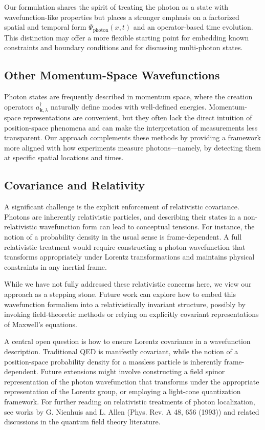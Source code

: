 \documentclass[aps,prl,twocolumn,showpacs,showkeys,superscriptaddress,amsmath,amssymb]{revtex4-2}
\begin{document}
Our formulation shares the spirit of treating the photon as a state with wavefunction-like properties but places a stronger emphasis on a factorized spatial and temporal form $\Psi_{\text{photon}}(x,t)$ and an operator-based time evolution. This distinction may offer a more flexible starting point for embedding known constraints and boundary conditions and for discussing multi-photon states.

\subsection{Other Momentum-Space Wavefunctions}

Photon states are frequently described in momentum space, where the creation operators $a^\dagger_{\mathbf{k},\lambda}$ naturally define modes with well-defined energies. Momentum-space representations are convenient, but they often lack the direct intuition of position-space phenomena and can make the interpretation of measurements less transparent. Our approach complements these methods by providing a framework more aligned with how experiments measure photons—namely, by detecting them at specific spatial locations and times.

\subsection{Covariance and Relativity}

A significant challenge is the explicit enforcement of relativistic covariance. Photons are inherently relativistic particles, and describing their states in a non-relativistic wavefunction form can lead to conceptual tensions. For instance, the notion of a probability density in the usual sense is frame-dependent. A full relativistic treatment would require constructing a photon wavefunction that transforms appropriately under Lorentz transformations and maintains physical constraints in any inertial frame.

While we have not fully addressed these relativistic concerns here, we view our approach as a stepping stone. Future work can explore how to embed this wavefunction formalism into a relativistically invariant structure, possibly by invoking field-theoretic methods or relying on explicitly covariant representations of Maxwell’s equations.

A central open question is how to ensure Lorentz covariance in a wavefunction description. Traditional QED is manifestly covariant, while the notion of a position-space probability density for a massless particle is inherently frame-dependent. Future extensions might involve constructing a field spinor representation of the photon wavefunction that transforms under the appropriate representation of the Lorentz group, or employing a light-cone quantization framework. For further reading on relativistic treatments of photon localization, see works by G. Nienhuis and L. Allen (Phys. Rev. A 48, 656 (1993)) and related discussions in the quantum field theory literature.
\end{document}
